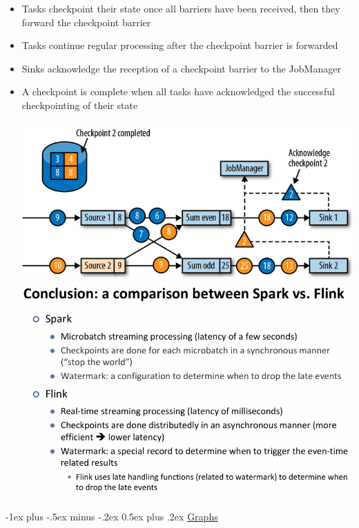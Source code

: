 \documentclass[10pt, landscape]{article}
\makeatletter
\renewcommand{\section}{\@startsection{section}{1}{0mm}%
  {-1ex plus -.5ex minus -.2ex}%
  {0.5ex plus .2ex}%
{\normalfont\large\bfseries}}
\makeatother
\begin{document}
\begin{multicols*}{4}
\begin{itemize}
\begin{itemize}
\begin{itemize}
                \item Tasks checkpoint their state once all barriers have been received, then they forward the checkpoint barrier
                \item Tasks continue regular processing after the checkpoint barrier is forwarded
                \item Sinks acknowledge the reception of a checkpoint barrier to the JobManager
                \item A checkpoint is complete when all tasks have acknowledged the successful checkpointing of their state
                \includegraphics[width=0.95\linewidth]{flink_checkpoint_end_acknowledgement.png}
                \includegraphics[width=0.95\linewidth]{flink_vs_spark.png}
              \end{itemize}
        \end{itemize}
\end{itemize}

\section{\underline{Graphs}}


\end{multicols*}
\end{document}
